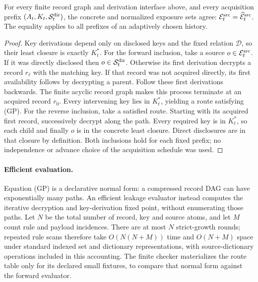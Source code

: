 \begin{theorem}
\label{thm:guarded-normalization}
For every finite record graph and derivation interface above, and every
acquisition prefix $(A_t,K_t,\mathcal S^{\rm dir}_t)$, the concrete and normalized exposure
sets agree: $\mathcal E^{\rm src}_t=\widehat{\mathcal E}^{\rm src}_t$.  The equality applies to all prefixes of
an adaptively chosen history.
\end{theorem}
\begin{proof}
Key derivations depend only on disclosed keys and the fixed relation
$\mathcal D$, so their least closure is exactly $K_t^*$.
For the forward inclusion, take a source $o\in \mathcal E^{\rm src}_t$.
If it was directly disclosed then $o\in \mathcal S^{\rm dir}_t$.
Otherwise its first derivation decrypts a record $r_\ell$ with the
matching key.  If that record was not acquired directly, its first
availability follows by decrypting a parent.  Follow these first
derivations backwards.  The finite acyclic record graph makes this
process terminate at an acquired record $r_0$.  Every intervening key
lies in $K_t^*$, yielding a route satisfying (GP).
For the reverse inclusion, take a satisfied route.  Starting with its
acquired first record, successively decrypt along the path.  Every
required key is in $K_t^*$, so each child and finally $o$ is in the
concrete least closure.  Direct disclosures are in that closure by
definition.  Both inclusions hold for each fixed prefix; no independence
or advance choice of the acquisition schedule was used.
\end{proof}

\paragraph{Efficient evaluation.}
Equation (GP) is a declarative normal form: a compressed record DAG can
have exponentially many paths.  An efficient leakage evaluator instead
computes the iterative decryption and key-derivation fixed point, without
enumerating those paths.  Let $N$ be the total number of record, key and
source atoms, and let $M$ count rule and payload incidences.  There are at
most $N$ strict-growth rounds; repeated rule scans therefore take
$O(N(N+M))$ time and $O(N+M)$ space under standard indexed set and
dictionary representations, with source-dictionary operations included
in this accounting.  The finite checker materializes the route table only
for its declared small fixtures, to compare that normal form against the
forward evaluator.

